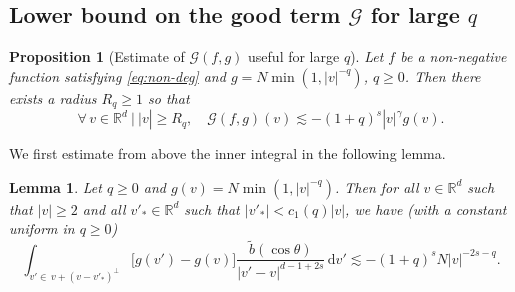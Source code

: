 \documentclass[11pt]{article}
\newcommand{\Subsection}{\subsection}
\theoremstyle{plain}
\newtheorem{prop}[thm]{Proposition}
\newtheorem{lemma}[thm]{Lemma}
\theoremstyle{definition}
\numberwithin{equation}{section}
\newcommand{\R}{\mathbb R}
\newcommand{\dd} {\, \mathrm{d}}
\let\A N
\begin{document}
\Subsection{Lower bound on the good term $\mathcal G$ for large $q$}

\begin{prop}[Estimate of {$\mathcal{G} (f,g)$} useful for large
$q$] \label{prop:G-bis} Let $f$ be a non-negative function satisfying \eqref{eq:non-deg} and
$g = \A \min(1,|v|^{-q})$, $q \ge 0$. Then there exists a radius
$R_q \geq 1$ so that
\[ \forall \, v \in \R^d \ | \ |v| \geq R_q, \quad
\mathcal{G}(f,g)(v) \lesssim - (1+q)^s |v|^{\gamma} g(v). \]
\end{prop}

We first estimate from above the inner integral in the following lemma.
\begin{lemma} \label{l:good-cone} Let $q \geq 0$ and
$g (v) = \A \min(1,|v|^{-q})$. Then for all $v \in \R^d$ such that
$|v| \ge 2$ and all $v'_* \in \R^d$ such that $|v'_*| < c_1(q)|v|$,
we have (with a constant uniform in $q \ge 0$)
\[
\int_{v'\in \, v + (v-v'_*)^\bot} \big[ g(v') - g(v)\big] \frac{\tilde
b(\cos \theta)}{|v'-v|^{d-1+2s}} \dd v' \lesssim - (1+q)^s \A
|v|^{-2s-q}.
\]
\end{lemma}
\end{document}
